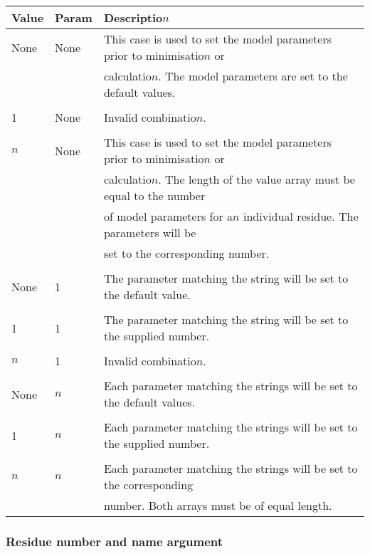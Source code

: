 \begin{center}
\begin{tabular}{lll}
\toprule
Value & Param & Descriptio$n$ \\
\midrule
None & None & This case is used to set the model parameters prior to minimisatio$n$ or \\
 &  & calculatio$n$.  The model parameters are set to the default values. \\
 &  &  \\
1 & None & Invalid combinatio$n$. \\
 &  &  \\
$n$ & None & This case is used to set the model parameters prior to minimisatio$n$ or \\
 &  & calculatio$n$.  The length of the value array must be equal to the number \\
 &  & of model parameters for a$n$ individual residue.  The parameters will be \\
 &  & set to the corresponding number. \\
 &  &  \\
None & 1 & The parameter matching the string will be set to the default value. \\
 &  &  \\
1 & 1 & The parameter matching the string will be set to the supplied number. \\
 &  &  \\
$n$ & 1 & Invalid combinatio$n$. \\
 &  &  \\
None & $n$ & Each parameter matching the strings will be set to the default values. \\
 &  &  \\
1 & $n$ & Each parameter matching the strings will be set to the supplied number. \\
 &  &  \\
$n$ & $n$ & Each parameter matching the strings will be set to the corresponding \\
 &  & number.  Both arrays must be of equal length. \\
\bottomrule
\end{tabular}
\end{center}



\subsubsection{Residue number and name argument}

